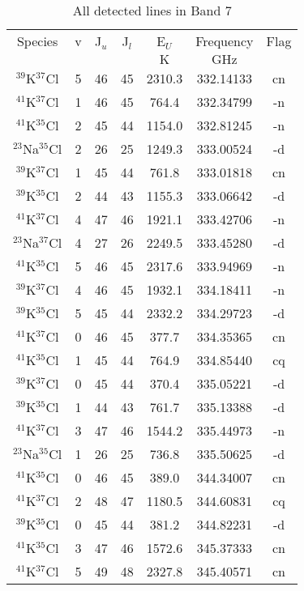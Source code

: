 \begin{table*}[htp]
\centering
\caption{All detected lines in Band 7}
\begin{tabular}{ccccccc}
\label{tab:all_detections_B7}
Species & v & J$_u$ & J$_l$ & E$_U$ & Frequency & Flag \\
 &  &  &  & $\mathrm{K}$ & $\mathrm{GHz}$ &  \\
\hline
$^{39}$K$^{37}$Cl & 5 & 46 & 45 & 2310.3 & 332.14133 & cn \\
$^{41}$K$^{37}$Cl & 1 & 46 & 45 & 764.4 & 332.34799 & -n \\
$^{41}$K$^{35}$Cl & 2 & 45 & 44 & 1154.0 & 332.81245 & -n \\
$^{23}$Na$^{35}$Cl & 2 & 26 & 25 & 1249.3 & 333.00524 & -d \\
$^{39}$K$^{37}$Cl & 1 & 45 & 44 & 761.8 & 333.01818 & cn \\
$^{39}$K$^{35}$Cl & 2 & 44 & 43 & 1155.3 & 333.06642 & -d \\
$^{41}$K$^{37}$Cl & 4 & 47 & 46 & 1921.1 & 333.42706 & -n \\
$^{23}$Na$^{37}$Cl & 4 & 27 & 26 & 2249.5 & 333.45280 & -d \\
$^{41}$K$^{35}$Cl & 5 & 46 & 45 & 2317.6 & 333.94969 & -n \\
$^{39}$K$^{37}$Cl & 4 & 46 & 45 & 1932.1 & 334.18411 & -n \\
$^{39}$K$^{35}$Cl & 5 & 45 & 44 & 2332.2 & 334.29723 & -d \\
$^{41}$K$^{37}$Cl & 0 & 46 & 45 & 377.7 & 334.35365 & cn \\
$^{41}$K$^{35}$Cl & 1 & 45 & 44 & 764.9 & 334.85440 & cq \\
$^{39}$K$^{37}$Cl & 0 & 45 & 44 & 370.4 & 335.05221 & -d \\
$^{39}$K$^{35}$Cl & 1 & 44 & 43 & 761.7 & 335.13388 & -d \\
$^{41}$K$^{37}$Cl & 3 & 47 & 46 & 1544.2 & 335.44973 & -n \\
$^{23}$Na$^{35}$Cl & 1 & 26 & 25 & 736.8 & 335.50625 & -d \\
$^{41}$K$^{35}$Cl & 0 & 46 & 45 & 389.0 & 344.34007 & cn \\
$^{41}$K$^{37}$Cl & 2 & 48 & 47 & 1180.5 & 344.60831 & cq \\
$^{39}$K$^{35}$Cl & 0 & 45 & 44 & 381.2 & 344.82231 & -d \\
$^{41}$K$^{35}$Cl & 3 & 47 & 46 & 1572.6 & 345.37333 & cn \\
$^{41}$K$^{37}$Cl & 5 & 49 & 48 & 2327.8 & 345.40571 & cn \\

\end{tabular}
\end{table*}
